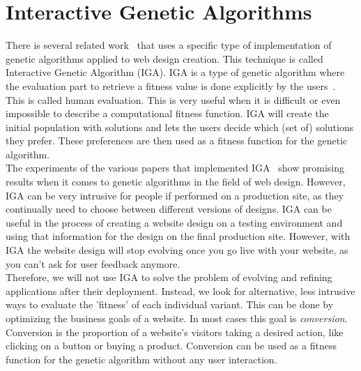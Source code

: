 \documentclass{report}
\begin{document}
\section{Interactive Genetic Algorithms}
There is several related work~\cite{park2007webpage,oliver2002interactive,sorn2013web} that uses a specific type of implementation of genetic algorithms applied to web design creation. This technique is called Interactive Genetic Algorithm (IGA). IGA is a type of genetic algorithm where the evaluation part to retrieve a fitness value is done explicitly by the users~\cite{takagi2001interactive}. This is called human evaluation. This is very useful when it is difficult or even impossible to describe a computational fitness function. IGA will create the initial population with solutions and lets the users decide which (set of) solutions they prefer. These preferences are then used as a fitness function for the genetic algorithm.\\

The experiments of the various papers that implemented IGA~\cite{park2007webpage,oliver2002interactive,sorn2013web} show promising results when it comes to genetic algorithms in the field of web design. However, IGA can be very intrusive for people if performed on a production site, as they continually need to choose between different versions of designs. IGA can be useful in the process of creating a website design on a testing environment and using that information for the design on the final production site. However, with IGA the website design will stop evolving once you go live with your website, as you can't ask for user feedback anymore.\\

Therefore, we will not use IGA to solve the problem of evolving and refining applications after their deployment. Instead, we look for alternative, less intrusive ways to evaluate the 'fitness' of each individual variant.  This can be done by optimizing the business goals of a website. In most cases this goal is \textit{conversion}. Conversion is the proportion of a website’s visitors taking a desired action, like clicking on a button or buying a product. Conversion can be used as a fitness function for the genetic algorithm without any user interaction.\\
\end{document}
